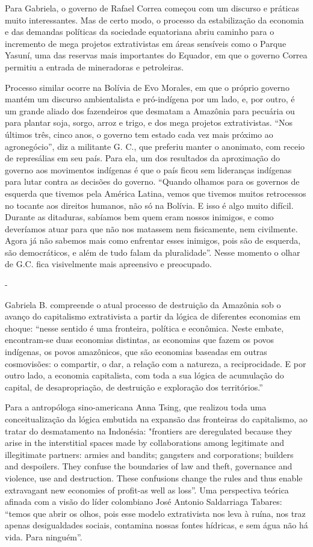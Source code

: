 Para Gabriela, o governo de Rafael Correa começou com um discurso e
práticas muito interessantes. Mas de certo modo, o processo da
estabilização da economia e das demandas políticas da sociedade
equatoriana abriu caminho para o incremento de mega projetos
extrativistas em áreas sensíveis como o Parque Yasuní, uma das reservas
mais importantes do Equador, em que o governo Correa permitiu a entrada
de mineradoras e petroleiras.

Processo similar ocorre na Bolívia de Evo Morales, em que o próprio
governo mantém um discurso ambientalista e pró-indígena por um lado, e,
por outro, é um grande aliado dos fazendeiros que desmatam a Amazônia
para pecuária ou para plantar soja, sorgo, arroz e trigo, e dos mega
projetos extrativistas. ``Nos últimos três, cinco anos, o governo tem
estado cada vez mais próximo ao agronegócio'', diz a militante G. C.,
que preferiu manter o anonimato, com receio de represálias em seu país.
Para ela, um dos resultados da aproximação do governo aos movimentos
indígenas é que o país ficou sem lideranças indígenas para lutar contra
as decisões do governo. ``Quando olhamos para os governos de esquerda
que tivemos pela América Latina, vemos que tivemos muitos retrocessos no
tocante aos direitos humanos, não só na Bolívia. E isso é algo muito
difícil. Durante as ditaduras, sabíamos bem quem eram nossos inimigos, e
como deveríamos atuar para que não nos matassem nem fisicamente, nem
civilmente. Agora já não sabemos mais como enfrentar esses inimigos,
pois são de esquerda, são democráticos, e além de tudo falam da
pluralidade''. Nesse momento o olhar de G.C. fica visivelmente mais
apreensivo e preocupado.

-

Gabriela B. compreende o atual processo de destruição da Amazônia sob o
avanço do capitalismo extrativista a partir da lógica de diferentes
economias em choque: ``nesse sentido é uma fronteira, política e
econômica. Neste embate, encontram-se duas economias distintas, as
economias que fazem os povos indígenas, os povos amazônicos, que são
economias baseadas em outras cosmovisões: o compartir, o dar, a relação
com a natureza, a reciprocidade. E por outro lado, a economia
capitalista, com toda a sua lógica de acumulação do capital, de
desapropriação, de destruição e exploração dos territórios.''

Para a antropóloga sino-americana Anna Tsing, que realizou toda uma
conceitualização da lógica embutida na expansão das fronteiras do
capitalismo, ao tratar do desmatamento na Indonésia: "frontiers are
deregulated because they arise in the interstitial spaces made by
collaborations among legitimate and illegitimate partners: armies and
bandits; gangsters and corporations; builders and despoilers. They
confuse the boundaries of law and theft, governance and violence, use
and destruction. These confusions change the rules and thus enable
extravagant new economies of profit-as well as loss''. Uma perspectiva
teórica afinada com a visão do líder colombiano José Antonio Saldarriaga
Tabares: ``temos que abrir os olhos, pois esse modelo extrativista nos
leva à ruína, nos traz apenas desigualdades sociais, contamina nossas
fontes hídricas, e sem água não há vida. Para ninguém''.

